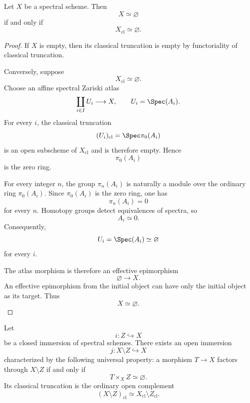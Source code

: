 \begin{lemma}
\label{lem:empty-spectral-scheme-classical-detection}
Let $X$ be a spectral scheme. Then
\[
    X
    \simeq
    \varnothing
\]
if and only if
\[
    X_{\mathrm{cl}}
    \simeq
    \varnothing.
\]
\end{lemma}

\begin{proof}
If $X$ is empty, then its classical truncation is empty by functoriality
of classical truncation.

Conversely, suppose
\[
    X_{\mathrm{cl}}
    \simeq
    \varnothing.
\]
Choose an affine spectral Zariski atlas
\[
    \coprod_{i\in I}
    U_i
    \longrightarrow
    X,
    \qquad
    U_i=\Spec(A_i).
\]
For every $i$, the classical truncation
\[
    (U_i)_{\mathrm{cl}}
    =
    \Spec\pi_0(A_i)
\]
is an open subscheme of $X_{\mathrm{cl}}$ and is therefore empty. Hence
\[
    \pi_0(A_i)
\]
is the zero ring.

For every integer $n$, the group $\pi_n(A_i)$ is naturally a module over
the ordinary ring $\pi_0(A_i)$. Since $\pi_0(A_i)$ is the zero ring, one
has
\[
    \pi_n(A_i)=0
\]
for every $n$. Homotopy groups detect equivalences of spectra, so
\[
    A_i
    \simeq
    0.
\]
Consequently,
\[
    U_i
    =
    \Spec(A_i)
    \simeq
    \varnothing
\]
for every $i$.

The atlas morphism is therefore an effective epimorphism
\[
    \varnothing
    \longrightarrow
    X.
\]
An effective epimorphism from the initial object can have only the
initial object as its target. Thus
\[
    X
    \simeq
    \varnothing.
\]
\end{proof}

\begin{theorem}
\label{thm:complement-closed-immersion}
Let
\[
    i
    \colon
    Z
    \hookrightarrow
    X
\]
be a closed immersion of spectral schemes. There exists an open immersion
\[
    j
    \colon
    X\setminus Z
    \hookrightarrow
    X
\]
characterized by the following universal property: a morphism
$T\to X$ factors through $X\setminus Z$ if and only if
\[
    T\times_X Z
    \simeq
    \varnothing.
\]
Its classical truncation is the ordinary open complement
\[
    (X\setminus Z)_{\mathrm{cl}}
    \simeq
    X_{\mathrm{cl}}\setminus Z_{\mathrm{cl}}.
\]
\end{theorem}

